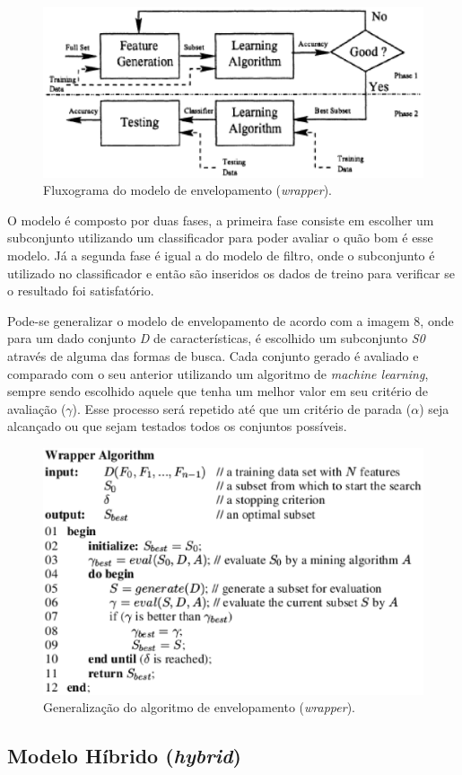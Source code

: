 \begin{figure}[h]
	\centering
	\label{fig07}
		\includegraphics[keepaspectratio=true,scale=1]{figuras/fig06.eps}
	\caption{Fluxograma do modelo de envelopamento (\textit{wrapper}). \cite{huan_1998}}
\end{figure}

O modelo é composto por duas fases, a primeira fase consiste em escolher um subconjunto utilizando um classificador para poder avaliar o quão bom é esse modelo. Já a segunda fase é igual a do modelo de filtro, onde o subconjunto é utilizado no classificador e então são inseridos os dados de treino para verificar se o resultado foi satisfatório.

Pode-se generalizar o modelo de envelopamento de acordo com a imagem 8, onde para um dado conjunto \textit{D} de características, é escolhido um subconjunto \textit{S0} através de alguma das formas de busca. Cada conjunto gerado é avaliado e comparado com o seu anterior utilizando um algoritmo de \textit{machine learning}, sempre sendo escolhido aquele que tenha um melhor valor em seu critério de avaliação ($\gamma$). Esse processo será repetido até que um critério de parada ($\alpha$) seja alcançado ou que sejam testados todos os conjuntos possíveis. \cite{liu_2005}


\begin{figure}[h]
	\centering
	\label{fig05}
		\includegraphics[keepaspectratio=true,scale=0.7]{figuras/fig08.eps}
	\caption{Generalização do algoritmo de envelopamento (\textit{wrapper}). \cite{liu_2005}}
\end{figure}

\subsection{Modelo Híbrido (\textit{hybrid})}